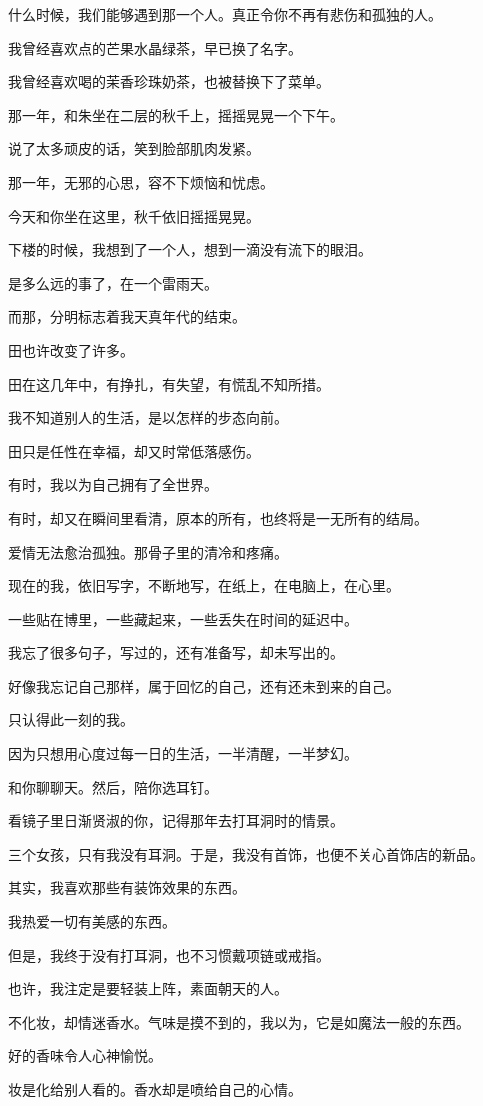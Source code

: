 		什么时候，我们能够遇到那一个人。真正令你不再有悲伤和孤独的人。

		我曾经喜欢点的芒果水晶绿茶，早已换了名字。\par
		我曾经喜欢喝的茉香珍珠奶茶，也被替换下了菜单。\par
		那一年，和朱坐在二层的秋千上，摇摇晃晃一个下午。\par
		说了太多顽皮的话，笑到脸部肌肉发紧。\par
		那一年，无邪的心思，容不下烦恼和忧虑。\par
		今天和你坐在这里，秋千依旧摇摇晃晃。\par
		下楼的时候，我想到了一个人，想到一滴没有流下的眼泪。\par
		是多么远的事了，在一个雷雨天。\par
		而那，分明标志着我天真年代的结束。

		田也许改变了许多。\par
		田在这几年中，有挣扎，有失望，有慌乱不知所措。\par
		我不知道别人的生活，是以怎样的步态向前。\par
		田只是任性在幸福，却又时常低落感伤。\par
		有时，我以为自己拥有了全世界。\par
		有时，却又在瞬间里看清，原本的所有，也终将是一无所有的结局。\par
		爱情无法愈治孤独。那骨子里的清冷和疼痛。\par
		现在的我，依旧写字，不断地写，在纸上，在电脑上，在心里。\par
		一些贴在博里，一些藏起来，一些丢失在时间的延迟中。\par
		我忘了很多句子，写过的，还有准备写，却未写出的。\par
		好像我忘记自己那样，属于回忆的自己，还有还未到来的自己。\par
		只认得此一刻的我。\par
		因为只想用心度过每一日的生活，一半清醒，一半梦幻。

		和你聊聊天。然后，陪你选耳钉。\par
		看镜子里日渐贤淑的你，记得那年去打耳洞时的情景。\par
		三个女孩，只有我没有耳洞。于是，我没有首饰，也便不关心首饰店的新品。\par
		其实，我喜欢那些有装饰效果的东西。\par
		我热爱一切有美感的东西。\par
		但是，我终于没有打耳洞，也不习惯戴项链或戒指。\par
		也许，我注定是要轻装上阵，素面朝天的人。\par
		不化妆，却情迷香水。气味是摸不到的，我以为，它是如魔法一般的东西。\par
		好的香味令人心神愉悦。\par
		妆是化给别人看的。香水却是喷给自己的心情。

